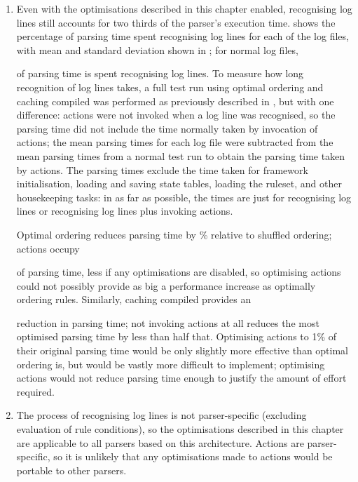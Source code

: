\begin{enumerate}

    \item Even with the optimisations described in this chapter enabled,
        recognising log lines still accounts for two thirds of the parser's
        execution time.   shows the percentage of parsing time
        spent recognising log lines for each of the \numberOFlogFILES{} log
        files, with mean and standard deviation shown in
        ; for normal log files,
        
        of parsing time is spent recognising log lines.  To measure how
        long recognition of log lines takes, a full test run using optimal
        ordering and caching compiled \regexes{} was performed as
        previously described in , but with
        one difference: actions were not invoked when a log line was
        recognised, so the parsing time did not include the time normally
        taken by invocation of actions; the mean parsing times for each log
        file were subtracted from the mean parsing times from a normal test
        run to obtain the parsing time taken by actions.  The parsing times
        exclude the time taken for framework initialisation, loading and
        saving state tables, loading the ruleset, and other housekeeping
        tasks: in as far as possible, the times are just for recognising
        log lines or recognising log lines plus invoking actions.

        Optimal ordering reduces parsing time by
        \%
        relative to shuffled ordering; actions occupy
        
        of parsing time, less if any optimisations are disabled, so
        optimising actions could not possibly provide as big a performance
        increase as optimally ordering rules.  Similarly, caching compiled
        \regexes{} provides an
        
        reduction in parsing time; not invoking actions at all reduces the
        most optimised parsing time by less than half that.  Optimising
        actions to 1\% of their original parsing time would be only
        slightly more effective than optimal ordering is, but would be
        vastly more difficult to implement; optimising actions would not
        reduce parsing time enough to justify the amount of effort
        required.

    \item The process of recognising log lines is not parser-specific
        (excluding evaluation of rule conditions), so the optimisations
        described in this chapter are applicable to all parsers based on
        this architecture.  Actions are parser-specific, so it is unlikely
        that any optimisations made to actions would be portable to other
        parsers.

\end{enumerate}

